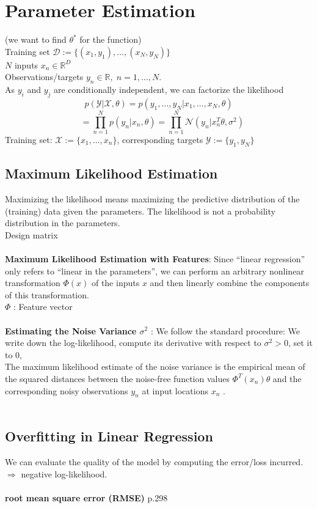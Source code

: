\section{Parameter Estimation} (we want to find $\theta^{\ast}$ for the function) \\
Training set $\mathcal{D} := \{(x_1,y_1),\dots,(x_N,y_N)\}$ \\
$N$ inputs $x_n \in \mathbb{R}^D$ \\
Observations/targets $y_n \in \mathbb{R},\; n = 1,\dots,N$. \\
As $y_i$ and $y_j$ are conditionally independent, we can factorize the likelihood 
\[
p(\mathcal{Y} | \mathcal{X}, \theta) = p(y_1,\dots,y_N|x_1,\dots,x_N,\theta) \tag{9.5a}
\]
\[
\; \; \;  = \prod_{n=1}^{N} p(y_n|x_n,\theta) = \prod_{n=1}^{N} \mathcal{N}(y_n|x_n^{T} \theta, \sigma^2) \tag{9.5b}
\]
Training set: $\mathcal{X} := \{x_1,\dots,x_n\}$, corresponding targets  $\mathcal{Y} := \{y_1,y_N\}$
\subsection{Maximum Likelihood Estimation}
Maximizing the likelihood means maximizing the predictive distribution of the (training) data given the parameters. The likelihood is not a probability distribution in the parameters. \\
Design matrix \\ \\
\textbf{Maximum Likelihood Estimation with Features}: Since “linear regression” only refers to “linear in the parameters”, we can perform an arbitrary nonlinear transformation $\Phi(x)$ of the inputs $x$ and then linearly combine the components of this transformation.\\
$\Phi$ : Feature vector \\ \\
\textbf{Estimating the Noise Variance $\sigma^2$} : We follow the standard procedure: We write down the log-likelihood, compute its derivative with respect to $\sigma^2 > 0$, set it to $0$,\\
The maximum likelihood estimate of the noise variance is the empirical mean of the squared distances between the noise-free function values $\Phi^{T}(x_n) \theta$ and the corresponding noisy observations $y_n$ at input locations $x_n$ . \\ \\
\subsection{Overfitting in Linear Regression}
We can evaluate the quality of the model by computing the error/loss incurred. $\Rightarrow$ negative log-likelihood. \\ \\ 
\textbf{root mean square error (RMSE)} p.298 \\

